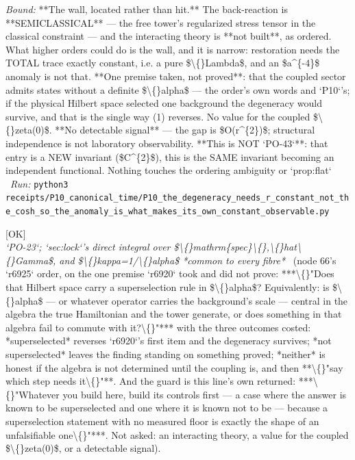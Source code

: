 \begin{description}
 \emph{Bound:} **The wall, located rather than hit.** The back-reaction is **SEMICLASSICAL** --- the free tower's regularized stress tensor in the classical constraint --- and the interacting theory is **not built**, as ordered. What higher orders could do is the wall, and it is narrow: restoration needs the TOTAL trace exactly constant, i.e. a pure \$\textbackslash\{\}Lambda\$, and an \$a\textasciicircum{}\{-4\}\$ anomaly is not that.  **One premise taken, not proved**: that the coupled sector admits states without a definite \$\textbackslash\{\}alpha\$ --- the order's own words and `P10`'s; if the physical Hilbert space selected one background the degeneracy would survive, and that is the single way (1) reverses. No value for the coupled \$\textbackslash\{\}zeta(0)\$.  **No detectable signal** --- the gap is \$O(r\textasciicircum{}\{2\})\$; structural independence is not laboratory observability. **This is NOT `PO-43`**: that entry is a NEW invariant (\$C\textasciicircum{}\{2\}\$), this is the SAME invariant becoming an independent functional. Nothing touches the ordering ambiguity or `prop:flat`
\ \emph{Run:} \texttt{python3 receipts/P10\_canonical\_time/P10\_the\_degeneracy\_needs\_r\_constant\_not\_the\_cosh\_so\_the\_anomaly\_is\_what\_makes\_its\_own\_constant\_observable.py}
\item[\rcptlabel{P10_the_premise_is_not_load_bearing_because_superselection_forbids_coherence_and_not_the_ensemble}{P10R25}\textbf{P10R25}\quad\texttt{P10\_the\_premise\_is\_not\_load\_bearing\_because\_superselection\_forbids\_coherence\_and\_not\_the\_ensemble}]\hfill\textsf{[OK]}\\
\textit{`PO-23`; `sec:lock`'s direct integral over \$\textbackslash\{\}mathrm\{spec\}\textbackslash\{\},\textbackslash\{\}hat\textbackslash\{\}Gamma\$, and \$\textbackslash\{\}kappa=1/\textbackslash\{\}alpha\$ *common to every fibre*} \ (node 66's `r6925` order, on the one premise `r6920` took and did not prove: ***\textbackslash\{\}"Does that Hilbert space carry a superselection rule in \$\textbackslash\{\}alpha\$?  Equivalently: is \$\textbackslash\{\}alpha\$ --- or whatever operator carries the background's scale --- central in the algebra the true Hamiltonian and the tower generate, or does something in that algebra fail to commute with it?\textbackslash\{\}"*** with the three outcomes costed: *superselected* reverses `r6920`'s first item and the degeneracy survives; *not superselected* leaves the finding standing on something proved; *neither* is honest if the algebra is not determined until the coupling is, and then **\textbackslash\{\}"say which step needs it\textbackslash\{\}"**.   And the guard is this line's own returned: ***\textbackslash\{\}"Whatever you build here, build its controls first --- a case where the answer is known to be superselected and one where it is known not to be --- because a superselection statement with no measured floor is exactly the shape of an unfalsifiable one\textbackslash\{\}"***.  Not asked: an interacting theory, a value for the coupled \$\textbackslash\{\}zeta(0)\$, or a detectable signal). 

\end{description}
